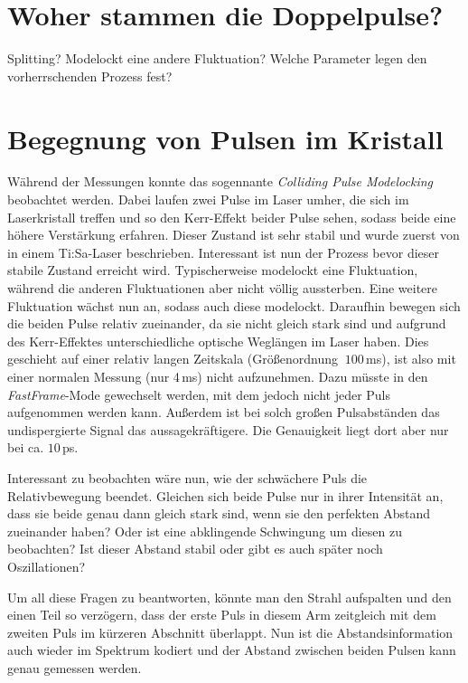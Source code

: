 \documentclass[bachelor,       %
               twoside,        %
               BCOR10mm,       %
               liststotoc,nomtotoc,bibtotoc, %
               english,ngerman, %
               final,          %
               ]{GAUBM}
\begin{document}
\section{Woher stammen die Doppelpulse?}
Splitting?
Modelockt eine andere Fluktuation?
Welche Parameter legen den vorherrschenden Prozess fest?

\section{Begegnung von Pulsen im Kristall}
\label{sec:cpml}
Während der Messungen konnte das sogennante \textit{Colliding Pulse Modelocking} beobachtet werden.
Dabei laufen zwei Pulse im Laser umher, die sich im Laserkristall treffen und so den Kerr-Effekt beider Pulse sehen, sodass beide eine höhere Verstärkung erfahren.
Dieser Zustand ist sehr stabil und wurde zuerst von \cite{lai_multiple_1997} in einem Ti:Sa-Laser beschrieben.
Interessant ist nun der Prozess bevor dieser stabile Zustand erreicht wird.
Typischerweise modelockt eine Fluktuation, während die anderen Fluktuationen aber nicht völlig aussterben.
Eine weitere Fluktuation wächst nun an, sodass auch diese modelockt.
Daraufhin bewegen sich die beiden Pulse relativ zueinander, da sie nicht gleich stark sind und aufgrund des Kerr-Effektes unterschiedliche optische Weglängen im Laser haben.
Dies geschieht auf einer relativ langen Zeitskala (Größenordnung $~100\,$ms), ist also mit einer normalen Messung (nur 4\,ms) nicht aufzunehmen.
Dazu müsste in den \textit{FastFrame}-Mode gewechselt werden, mit dem jedoch nicht jeder Puls aufgenommen werden kann.
Außerdem ist bei solch großen Pulsabständen das undispergierte Signal das aussagekräftigere.
Die Genauigkeit liegt dort aber nur bei ca. $10\,$ps.

Interessant zu beobachten wäre nun, wie der schwächere Puls die Relativbewegung beendet.
Gleichen sich beide Pulse nur in ihrer Intensität an, dass sie beide genau dann gleich stark sind, wenn sie den perfekten Abstand zueinander haben?
Oder ist eine abklingende Schwingung um diesen zu beobachten?
Ist dieser Abstand stabil oder gibt es auch später noch Oszillationen?

Um all diese Fragen zu beantworten, könnte man den Strahl aufspalten und den einen Teil so verzögern, dass der erste Puls in diesem Arm zeitgleich mit dem zweiten Puls im kürzeren Abschnitt überlappt.
Nun ist die Abstandsinformation auch wieder im Spektrum kodiert und der Abstand zwischen beiden Pulsen kann genau gemessen werden.
\end{document}
